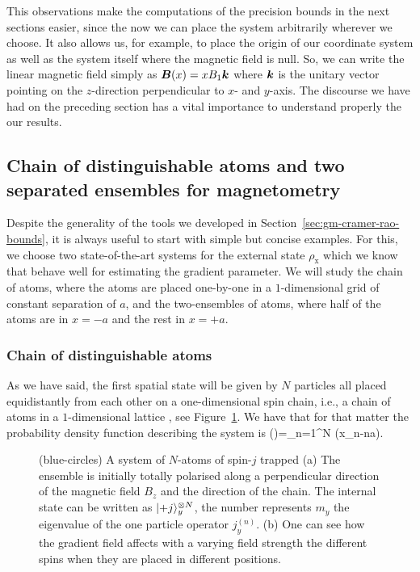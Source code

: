This observations make the computations of the precision bounds in the next sections easier, since the now we can place the system arbitrarily wherever we choose.
It also allows us, for example, to place the origin of our coordinate system as well as the system itself where the magnetic field is null.
So, we can write the linear magnetic field simply as $\boldsymbol{B}(x)= xB_1\boldsymbol{k}$ where $\boldsymbol{k}$ is the unitary vector pointing on the $z$-direction perpendicular to $x$- and $y$-axis.
The discourse we have had on the preceding section has a vital importance to understand properly the our results.


\subsection{Chain of distinguishable atoms and two separated ensembles for magnetometry}
\label{sec:gm-io-chain-and-two-ensembles}

Despite the generality of the tools we developed in Section~\ref{sec:gm-cramer-rao-bounds}, it is always useful to start with simple but concise examples.
For this, we choose two state-of-the-art systems for the external state $\rho_{\text{x}}$ which we know that behave well for estimating the gradient parameter.
We will study the chain of atoms, where the atoms are placed one-by-one in a $1$-dimensional grid of constant separation of $a$, and the two-ensembles of atoms, where half of the atoms are in $x=-a$ and the rest in $x=+a$.

\subsubsection{Chain of distinguishable atoms}

As we have said, the first spatial state will be given by $N$ particles all placed equidistantly from each other on a one-dimensional spin chain, i.e., a chain of atoms in a $1$-dimensional lattice
\cite{Altenburg2016},
see Figure~\ref{fig:ionchain-evolution}.
We have that for that matter the probability density function describing the system is
\be
  \prob()=\prod_{n=1}^N \delta(x_n-na).
\ee
\begin{figure}[htp]
  \begin{center}
    \caption[1-D chain of atoms polarized along $y$-axis under a gradient magnetic field]{(blue-circles) A system of $N$-atoms of spin-$j$ trapped
    (a) The ensemble is initially totally polarised along a
    perpendicular direction of the magnetic field $B_z$ and the direction of the chain.
    The internal state can be written as $\vert{+j}\rangle_{y}^{\otimes N}$, the number represents $m_y$ the eigenvalue of the one particle operator $j_y^{(n)}$.
    (b) One can see how the gradient field affects with a varying field strength the different spins when they are placed in different positions. }
    \label{fig:ionchain-evolution}
  \end{center}
\end{figure}

